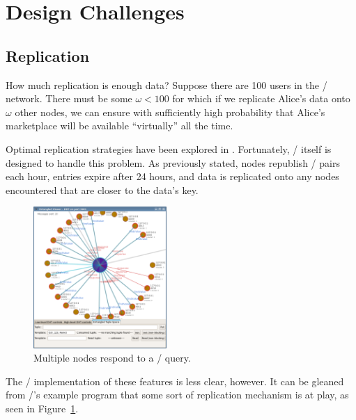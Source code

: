 \documentclass[11pt,twocolumn]{article}
\begin{document}
\section{Design Challenges}

\subsection{Replication}
How much replication is enough data?
Suppose there are 100 users in the \OpenBazaar/ network.
There must be some $\omega < 100$ for which if we replicate Alice's data onto $\omega$ other nodes, we can ensure with sufficiently high probability that Alice's marketplace will be available ``virtually'' all the time.

Optimal replication strategies have been explored in \cite{cohen}.
Fortunately, \Kademlia/ itself is designed to handle this problem.
As previously stated, nodes republish \kv/ pairs each hour, entries expire after 24 hours, and data is replicated onto any nodes encountered that are closer to the data's key.

\begin{figure}[h!]
  \centering
  \includegraphics[width=0.45\textwidth]{images/entangled_replication}
  \caption{\label{entangled_replication}Multiple nodes respond to a \findValue/ query.}
\end{figure}

The \Entangled/ implementation of these features is less clear, however.
It can be gleaned from \Entangled/'s example program that some sort of replication mechanism is at play, as seen in Figure~\ref{entangled_replication}.
\end{document}

